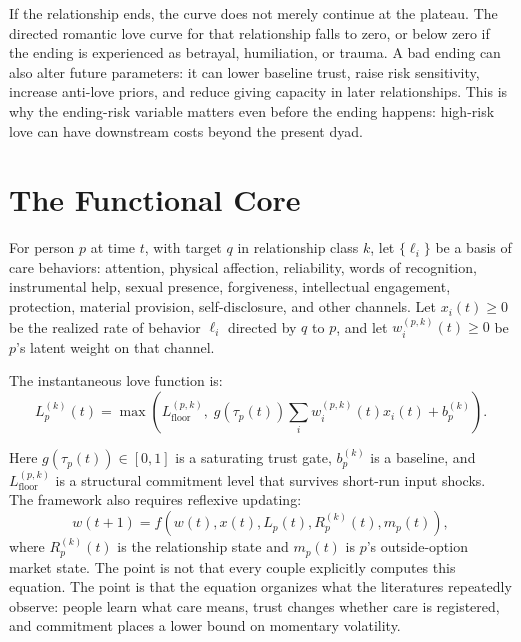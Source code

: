 \documentclass[11pt]{article}
\newcommand{\Lfloor}{L_{\mathrm{floor}}}
\begin{document}
If the relationship ends, the curve does not merely continue at the plateau. The directed romantic love curve for that relationship falls to zero, or below zero if the ending is experienced as betrayal, humiliation, or trauma. A bad ending can also alter future parameters: it can lower baseline trust, raise risk sensitivity, increase anti-love priors, and reduce giving capacity in later relationships. This is why the ending-risk variable matters even before the ending happens: high-risk love can have downstream costs beyond the present dyad.

\section{The Functional Core}
For person $p$ at time $t$, with target $q$ in relationship class $k$, let $\{\ell_i\}$ be a basis of care behaviors: attention, physical affection, reliability, words of recognition, instrumental help, sexual presence, forgiveness, intellectual engagement, protection, material provision, self-disclosure, and other channels. Let $x_i(t) \geq 0$ be the realized rate of behavior $\ell_i$ directed by $q$ to $p$, and let $w_i^{(p,k)}(t) \geq 0$ be $p$'s latent weight on that channel.

The instantaneous love function is:
\begin{equation}
L_p^{(k)}(t)=\max\left(\Lfloor^{(p,k)},\; g(\tau_p(t)) \sum_i w_i^{(p,k)}(t)x_i(t)+b_p^{(k)}\right).
\end{equation}

Here $g(\tau_p(t))\in[0,1]$ is a saturating trust gate, $b_p^{(k)}$ is a baseline, and $\Lfloor^{(p,k)}$ is a structural commitment level that survives short-run input shocks. The framework also requires reflexive updating:
\begin{equation}
w(t+1)=f(w(t),x(t),L_p(t),R_p^{(k)}(t),m_p(t)),
\end{equation}
where $R_p^{(k)}(t)$ is the relationship state and $m_p(t)$ is $p$'s outside-option market state. The point is not that every couple explicitly computes this equation. The point is that the equation organizes what the literatures repeatedly observe: people learn what care means, trust changes whether care is registered, and commitment places a lower bound on momentary volatility.
\end{document}
